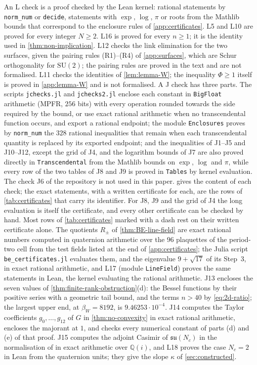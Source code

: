 \documentclass[11pt,a4paper]{amsart}
\theoremstyle{definition}
\theoremstyle{remark}
\numberwithin{equation}{section}
\newcommand{\SU}{\mathrm{SU}}              %
\newcommand{\betaW}{\beta_{W}}             %
\begin{document}
An L check is a proof checked by the Lean kernel: rational statements by \texttt{norm\_num} or \texttt{decide}, statements with $\exp$, $\log$, $\pi$ or roots from the Mathlib bounds that correspond to the enclosure rules of \cref{app:certificates}. L5 and L10 are proved for every integer $N\ge2$. L16 is proved for every $n\ge1$; it is the identity used in \cref{thm:non-implication}. L12 checks the link elimination for the two surfaces, given the pairing rules (R1)--(R4) of \cref{app:surfaces}, which are Schur orthogonality for $\SU(2)$; the pairing rules are proved in the text and are not formalised. L11 checks the identities of \cref{lem:lemma-W}; the inequality $\Phi\ge1$ itself is proved in \cref{app:lemma-W} and is not formalised. A J check has three parts. The scripts \texttt{jchecks.jl} and \texttt{jchecks2.jl} enclose each constant in \texttt{BigFloat} arithmetic (MPFR, $256$ bits) with every operation rounded towards the side required by the bound, or use exact rational arithmetic when no transcendental function occurs, and export a rational endpoint; the module \texttt{Enclosures} proves by \texttt{norm\_num} the $328$ rational inequalities that remain when each transcendental quantity is replaced by its exported endpoint; and the inequalities of J1--J5 and J10--J12, except the grid of J4, and the logarithm bounds of J7 are also proved directly in \texttt{Transcendental} from the Mathlib bounds on $\exp$, $\log$ and $\pi$, while every row of the two tables of J8 and J9 is proved in \texttt{Tables} by kernel evaluation. The check J6 of the repository is not used in this paper.  gives the content of each check; the exact statements, with a written certificate for each, are the rows of \cref{tab:certificates} that carry its identifier. For J8, J9 and the grid of J4 the long evaluation is itself the certificate, and every other certificate can be checked by hand. Most rows of \cref{tab:certificates} marked with a dash rest on their written certificate alone. The quotients $R_\pm$ of \cref{thm:BE-line-field} are exact rational numbers computed in quaternion arithmetic over the $96$ plaquettes of the period-two cell from the test fields listed at the end of \cref{app:certificates}; the Julia script \texttt{be\_certificates.jl} evaluates them, and the eigenvalue $9+\sqrt{17}$ of its Step~3, in exact rational arithmetic, and L17 (module \texttt{LineField}) proves the same statements in Lean, the kernel evaluating the rational arithmetic. J13 encloses the seven values of \cref{thm:finite-rank-obstruction}(d): the Bessel functions by their positive series with a geometric tail bound, and the terms $n>40$ by \eqref{eq:2d-ratio}; the largest upper end, at $\betaW=8192$, is $9.46253\cdot10^{-4}$. J14 computes the Taylor coefficients $g_0,\dots,g_{12}$ of $G$ in \cref{thm:no-convexity} in exact rational arithmetic, encloses the majorant at $1$, and checks every numerical constant of parts (d) and (e) of that proof. J15 computes the adjoint Casimir of $\mathfrak{su}(N_c)$ in the normalisation of \cite{openaiym} in exact arithmetic over $\mathbb Q(i)$, and L18 proves the case $N_c=2$ in Lean from the quaternion units; they give the slope $\kappa$ of \cref{sec:constructed}.
\end{document}
